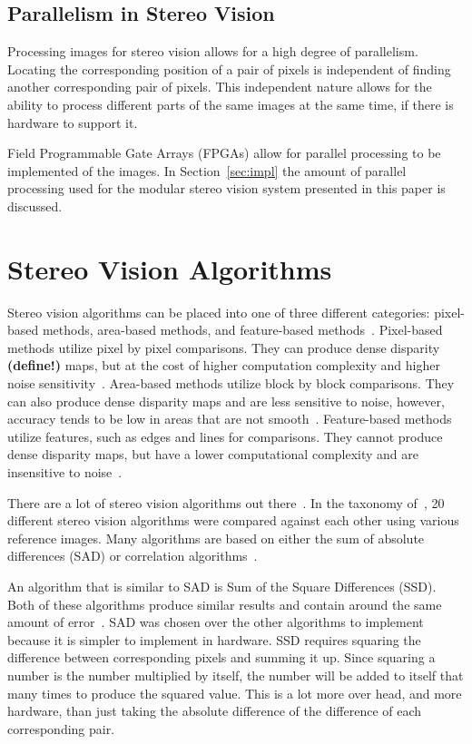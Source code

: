 \subsection{Parallelism in Stereo Vision}

Processing images for stereo vision allows for a high degree of parallelism. Locating the corresponding position of a pair of pixels is independent of finding another corresponding pair of pixels. This independent nature allows for the ability to process different parts of the same images at the same time, if there is hardware to support it.

Field Programmable Gate Arrays (FPGAs) allow for parallel processing to be implemented of the images. In Section~\ref{sec:impl} the amount of parallel processing used for the modular stereo vision system presented in this paper is discussed. 

\section{Stereo Vision Algorithms}

Stereo vision algorithms can be placed into one of three different categories: pixel-based methods, area-based methods, and feature-based methods~\cite{similarAlgorithms}. Pixel-based methods utilize pixel by pixel comparisons. They can produce dense disparity \textbf{(define!)} maps, but at the cost of higher computation complexity and higher noise sensitivity~\cite{similarAlgorithms}. Area-based methods utilize block by block comparisons. They can also produce dense disparity maps and are less sensitive to noise, however, accuracy tends to be low in areas that are not smooth~\cite{similarAlgorithms}. Feature-based methods utilize features, such as edges and lines for comparisons. They cannot produce dense disparity maps, but have a lower computational complexity and are insensitive to noise~\cite{similarAlgorithms}. 

There are a lot of stereo vision algorithms out there~\cite{taxonomy}. In the taxonomy of~\cite{taxonomy}, 20 different stereo vision algorithms were compared against each other using various reference images. Many algorithms are based on either the sum of absolute differences (SAD) or correlation algorithms~\cite{alteraStratixIVPaper}.

An algorithm that is similar to SAD is Sum of the Square Differences (SSD). Both of these algorithms produce similar results and contain around the same amount of error~\cite{similarAlgorithms}. SAD was chosen over the other algorithms to implement because it is simpler to implement in hardware. SSD requires squaring the difference between corresponding pixels and summing it up. Since squaring a number is the number multiplied by itself, the number will be added to itself that many times to produce the squared value. This is a lot more over head, and more hardware, than just taking the absolute difference of the difference of each corresponding pair.

